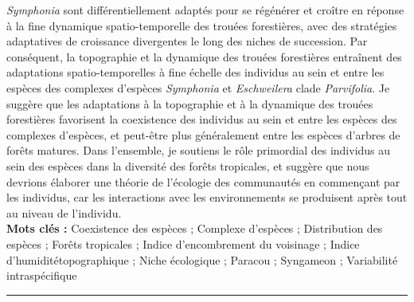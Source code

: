 {\emph{Symphonia} sont différentiellement adaptés pour se régénérer et croître en réponse à la fine dynamique spatio-temporelle des trouées forestières, avec des stratégies adaptatives de croissance  divergentes le long des niches de succession. Par conséquent, la topographie et la dynamique des trouées forestières entraînent des adaptations spatio-temporelles à fine échelle des individus au sein et entre les espèces des complexes d'espèces \emph{Symphonia} et \emph{Eschweilera} clade \emph{Parvifolia}. Je suggère que les adaptations à la topographie et à la dynamique des trouées forestières favorisent la coexistence des individus au sein et entre les espèces des complexes d'espèces, et peut-être plus généralement entre les espèces d'arbres de forêts matures. Dans l'ensemble, je soutiens le rôle primordial des individus au sein des espèces dans la diversité des forêts tropicales, et suggère que nous devrions élaborer une théorie de l'écologie des communautés en commençant par les individus, car les interactions avec les environnements se produisent après tout au niveau de l’individu. \\

\textbf{Mots clés :}
Coexistence des espèces ; Complexe d'espèces ; Distribution des espèces ; Forêts tropicales ; Indice d'encombrement du voisinage ; Indice d'humiditétopographique ; Niche écologique ; Paracou ; Syngameon ; Variabilité intraspécifique \vspace*{\baselineskip}
\newline\noindent\rule{\textwidth}{0.7pt}

}
